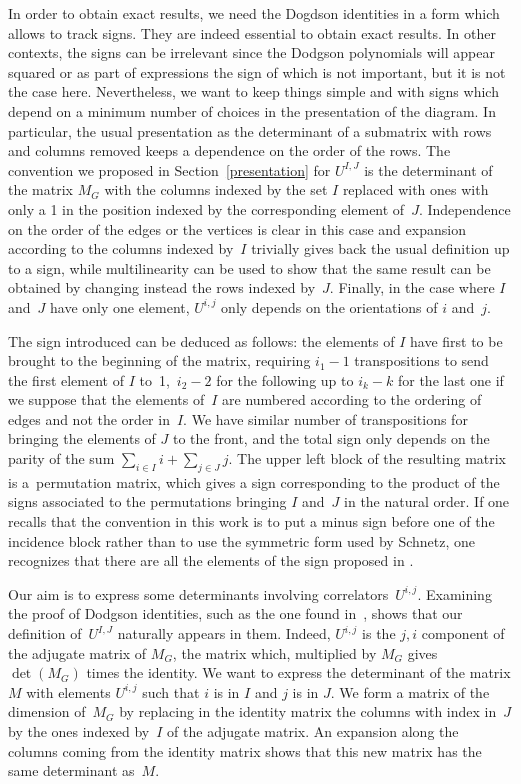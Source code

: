 \documentclass[pdftex]{sigma}
\numberwithin{equation}{section}
\begin{document}
In order to obtain exact results, we need the Dogdson identities in a form which allows to track signs.
They are indeed essential to obtain exact results. In other contexts, the signs can be irrelevant
since the Dodgson polynomials will appear squared or as part of expressions the sign of which is not important,
but it is not the case here. Nevertheless, we want to keep things simple and with
signs which depend on a minimum number of choices in the presentation of the diagram. In particular, the usual
presentation as the determinant of a submatrix with rows and columns removed keeps a dependence on the order
of the rows. The convention we proposed in Section~\ref{presentation} for $U^{I ,J}$ is the determinant of the matrix
$M_G$ with the columns indexed by the set $I$ replaced with ones with only a 1 in the position indexed by the corresponding
element of~$J$. Independence on the order of the edges or the vertices is clear in this case and expansion according to
the columns indexed by~$I$ trivially gives back the usual definition up to a sign, while multilinearity can be used to
show that the same result can be obtained by changing instead the rows indexed by~$J$. Finally, in the case where $I$
and~$J$ have only one element, $U^{i,j}$ only depends on the orientations of $i$ and~$j$.

The sign introduced can be deduced as follows: the elements of $I$ have first to be brought to the beginning of the matrix,
requiring $i_1 - 1$ transpositions to send the first element of $I$ to~1,~${i_2 -2}$ for the following up to $i_k -k $
for the last one if we suppose that the elements of~$I$ are numbered according to the ordering of edges and not the order in~$I$.
We have similar number of transpositions for bringing the elements of $J$ to the front, and the total sign only depends on the parity
of the sum $\sum_{i\in I} i+ \sum_{j\in J} j$. The upper left block of the resulting matrix is a~permutation matrix, which gives a sign
corresponding to the product of the signs associated to the permutations bringing $I$ and~$J$ in the natural order. If one recalls that
the convention in this work is to put a minus sign before one of the incidence block rather than to use the symmetric form used by Schnetz,
one recognizes that there are all the elements of the sign proposed in \cite[equation~(8)]{SC2021}.

Our aim is to express some determinants involving correlators~$U^{i,j}$. Examining the proof of Dodgson
identities, such
as the one found in~\cite{Br2009}, shows that our definition of~$U^{I ,J}$ naturally appears in them. Indeed, $U^{i,j}$
is the $j,i$ component of the adjugate matrix of $M_G$, the matrix which, multiplied by $M_G$ gives $\det(M_G)$
times the identity. We want to express the determinant of the matrix $M$ with elements $U^{i,j}$ such that $i$ is in $I$ and $j$ is in
$J$. We form a matrix of the dimension of~$M_G$ by replacing in the identity matrix the columns with index in~$J$ by the
ones indexed by~$I$ of the adjugate matrix. An expansion along the columns coming from the identity matrix shows
that this new matrix has the same determinant as~$M$.
\end{document}
